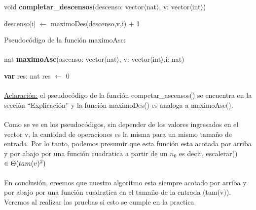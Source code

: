 void \textbf{completar\_descensos}(descenso: vector$\langle$nat$\rangle$, v: vector$\langle$int$\rangle$)\\
	\begin{algorithm}[H]
\BlankLine		
     {descenso[i] $\leftarrow$ maximoDes(descenso,v,i) + 1}
  \end{algorithm}

\vspace*{1cm}
Pseudocódigo de la función maximoAsc:
\\
\\
nat  \textbf{maximoAsc}(ascenso: vector$\langle$nat$\rangle$, v: vector$\langle$int$\rangle$,i: nat)\\
	\begin{algorithm}[H]
	\BlankLine		
      \textbf{var} res: nat 
      res $\leftarrow$ 0 
	\BlankLine		
  \end{algorithm}

\vspace*{1cm}

\paragraph{}
\underline{Aclaración:} el pseudocódigo de la función competar\_ascensos() se encuentra en la sección ``Explicación'' y la función maximoDes() es analoga a maximoAsc().

\paragraph{}
Como se ve en los pseudocódigos, sin depender de los valores ingresados en el vector v, la cantidad de operaciones es la misma para un mismo tamaño de entrada. Por lo tanto, podemos presumir que esta función esta acotada por arriba y por abajo por una función cuadratica a partir de un $n_0$ es decir, escalerar() $\in \Theta(tam(v)^2)$

\paragraph{}
En conclusión, creemos que nuestro algoritmo esta siempre acotado por arriba y por abajo por una función cuadratica en el tamaño de la entrada (tam(v)). Veremos al realizar las pruebas si esto se cumple en la practica.



